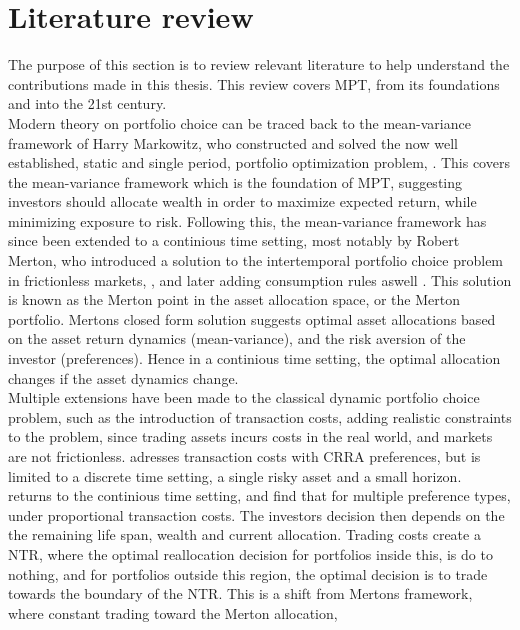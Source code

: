 \documentclass[11pt]{article}
\begin{document}
\fi


\section{Literature review}\label{sec: literature}
The purpose of this section is to review relevant literature to help understand the contributions made in this thesis. 
This review covers \ac{MPT}, from its foundations and into the 21st century. \\
Modern theory on portfolio choice can be traced back to the mean-variance framework of Harry Markowitz, who
constructed and solved the now well established, static and single period, portfolio optimization problem, \textcite{Markowitz1952}. 
This covers the mean-variance framework which is the foundation of \ac{MPT}, suggesting investors should allocate wealth in order to maximize expected return, while minimizing exposure to risk.
Following this, the mean-variance framework has since been extended to a continious time setting,
most notably by Robert Merton, who introduced a solution to the intertemporal portfolio choice problem in frictionless markets, \textcite{Merton1969}, 
and later adding consumption rules aswell \textcite{Merton1971}. This solution is known as the Merton point in the asset allocation space, or the Merton portfolio.
Mertons closed form solution suggests optimal asset allocations based on the asset return dynamics (mean-variance), and the risk aversion of the investor (preferences). 
Hence in a continious time setting, the optimal allocation changes if the asset dynamics change.\\
Multiple extensions have been made to the classical dynamic portfolio choice problem, such as the introduction of transaction costs,
adding realistic constraints to the problem, since trading assets incurs costs in the real world, and markets are not frictionless.
\textcite{Zabel1973} adresses transaction costs with CRRA preferences, but is limited to a discrete time setting, a single risky asset and a small horizon.\\
\textcite{Constantinides1976,Constantinides1986} returns to the continious time setting, and find that for multiple preference types,
under proportional transaction costs. The investors decision then depends on the the remaining life span, wealth and current allocation.
Trading costs create a \ac{NTR}, where the optimal reallocation decision for portfolios inside this, is do to nothing, and for portfolios outside this region,
the optimal decision is to trade towards the boundary of the \ac{NTR}. This is a shift from Mertons framework, where constant trading toward the Merton allocation,
\end{document}
